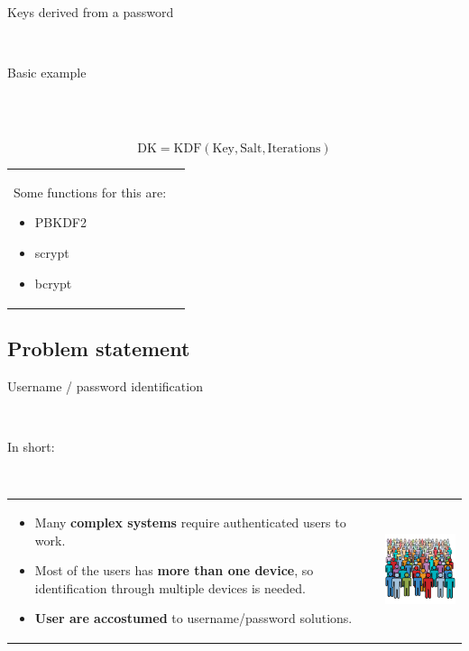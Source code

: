 \documentclass[12pt]{beamer}
\renewcommand{\frametitle}[1]{\vspace{0.2cm}\begin{huge}#1\end{huge}\\}
\renewcommand{\framesubtitle}[1]{\vspace{0.4cm} \hspace{0.4cm}\begin{large}#1\end{large}\\}
\begin{document}
  \begin{frame}
  \frametitle{Keys derived from a password}
  \framesubtitle{Basic example}
  \framesubtitle{}
  $$ \text{DK}=\text{KDF}(\text{Key}, \text{Salt}, \text{Iterations}) $$
  \begin{table}
  \begin{tabular}{p{7cm}p{3cm}}
  Some functions for this are:
  \begin{itemize}
    \item PBKDF2
    \item scrypt
    \item bcrypt
  \end{itemize}
  &
  \vspace{1.5cm}
  \end{tabular}
  \end{table}
  \end{frame}

  
  \subsection{Problem statement}
  \begin{frame}
  \frametitle{Username / password identification}
  \framesubtitle{In short:}
  \begin{table}
  \begin{tabular}{p{7cm}p{3cm}}
  \begin{itemize}
    \item Many \textbf{complex systems} require authenticated users to work.
    \item Most of the users has \textbf{more than one device}, so identification through
      multiple devices is needed.
    \item \textbf{User are accostumed} to username/password solutions.
  \end{itemize}
  &
  \vspace{1.5cm}
  \includegraphics[width=4cm]{../../presentacion/img/users}\\
  \end{tabular}
  \end{table}
  \end{frame}
  
\end{document}
